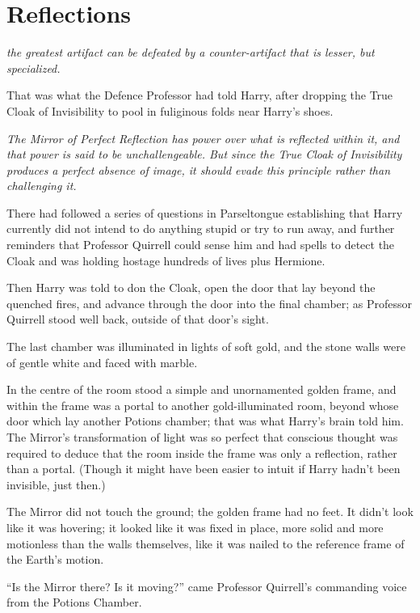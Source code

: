 \chapter{Reflections}

 \emph{the
greatest artifact can be defeated by a counter-artifact that is lesser, but
specialized.}

That was what the Defence Professor had told Harry, after dropping the True
Cloak of Invisibility to pool in fuliginous folds near Harry’s shoes.

\emph{The Mirror of Perfect Reflection has power over what is reflected within
it, and that power is said to be unchallengeable. But since the True Cloak of
Invisibility produces a perfect absence of image, it should evade this
principle rather than challenging it.}

There had followed a series of questions in Parseltongue establishing that
Harry currently did not intend to do anything stupid or try to run away, and
further reminders that Professor Quirrell could sense him and had spells to
detect the Cloak and was holding hostage hundreds of lives plus Hermione.

Then Harry was told to don the Cloak, open the door that lay beyond the
quenched fires, and advance through the door into the final chamber; as
Professor Quirrell stood well back, outside of that door’s sight.

The last chamber was illuminated in lights of soft gold, and the stone walls
were of gentle white and faced with marble.

In the centre of the room stood a simple and unornamented golden frame, and
within the frame was a portal to another gold-illuminated room, beyond whose
door which lay another Potions chamber; that was what Harry’s brain told him.
The Mirror’s transformation of light was so perfect that conscious thought was
required to deduce that the room inside the frame was only a reflection, rather
than a portal. (Though it might have been easier to intuit if Harry hadn’t been
invisible, just then.)

The Mirror did not touch the ground; the golden frame had no feet. It didn’t
look like it was hovering; it looked like it was fixed in place, more solid and
more motionless than the walls themselves, like it was nailed to the reference
frame of the Earth’s motion.

“Is the Mirror there? Is it moving?” came Professor Quirrell’s commanding voice
from the Potions Chamber.

